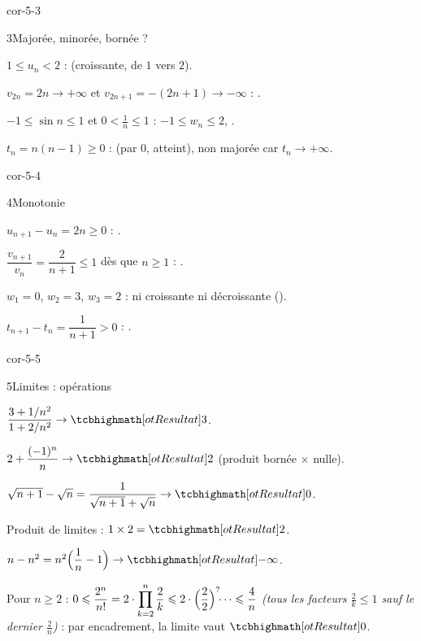 \begin{blocLivre}{cor-5-3}
\begin{corrige}{3}{Majorée, minorée, bornée ?}
\begin{questions}
  \item $1\leq u_n<2$ :  (croissante, de $1$ vers $2$).
  \item $v_{2n}=2n\to+\infty$ et $v_{2n+1}=-(2n+1)\to-\infty$ :
    .
  \item $-1\leq\sin n\leq1$ et $0<\frac1n\leq1$ : $-1\leq w_n\leq2$,
    .
  \item $t_n=n(n-1)\geq0$ :  (par $0$, atteint), non
    majorée car $t_n\to+\infty$.
\end{questions}
\end{corrige}
\end{blocLivre}

\begin{blocLivre}{cor-5-4}
\begin{corrige}{4}{Monotonie}
\begin{questions}
  \item $u_{n+1}-u_n=2n\geq0$ : .
  \item $\dfrac{v_{n+1}}{v_n}=\dfrac{2}{n+1}\leq1$ dès que $n\geq1$ :
    .
  \item $w_1=0$, $w_2=3$, $w_3=2$ : ni croissante ni décroissante
    ().
  \item $t_{n+1}-t_n=\dfrac{1}{n+1}>0$ : .
\end{questions}
\end{corrige}
\end{blocLivre}

\begin{blocLivre}{cor-5-5}
\begin{corrige}{5}{Limites : opérations}
\begin{questions}
  \item $\dfrac{3+1/n^{2}}{1+2/n^{2}}\to\res{3}$.
  \item $2+\dfrac{(-1)^{n}}{n}\to\res{2}$ (produit bornée $\times$ nulle).
  \item $\sqrt{n+1}-\sqrt n=\dfrac{1}{\sqrt{n+1}+\sqrt n}\to\res{0}$.
  \item Produit de limites : $1\times2=\res{2}$.
  \item $n-n^{2}=n^{2}\Bigl(\dfrac1n-1\Bigr)\to\res{-\infty}$.
  \item Pour $n\geq2$ : $0\leq\dfrac{2^{n}}{n!}=2\cdot\displaystyle\prod_{k=2}^{n}\frac{2}{k}
    \leq2\cdot\Bigl(\dfrac{2}{2}\Bigr)^{?}\!\!\cdots\leq\dfrac{4}{n}$
    \emph{(tous les facteurs $\frac2k\leq1$ sauf le dernier $\frac2n$)} :
    par encadrement, la limite vaut $\res{0}$.
\end{questions}
\end{corrige}
\end{blocLivre}

